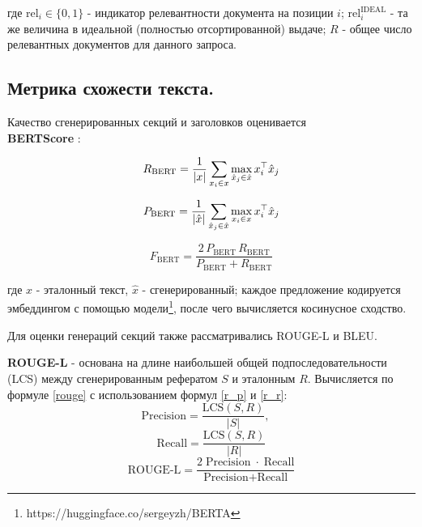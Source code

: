 \documentclass{article}
\begin{document}
где \(\mathrm{rel}_i\in\{0,1\}\) - индикатор релевантности документа на позиции \(i\); \(\mathrm{rel}^{\mathrm{IDEAL}}_i\) - та же величина в идеальной (полностью отсортированной) выдаче;  
\(R\) - общее число релевантных документов для данного запроса.  

\subsection*{Метрика схожести текста.} 
Качество сгенерированных секций и заголовков оценивается \\\textbf{BERTScore} \cite{bertscore}:

\begin{equation}\label{precision}
R_{\mathrm{BERT}}= \frac{1}{|x|}\sum_{x_i\in x}\max_{\hat{x}_j\in\hat{x}} x_i^\top \hat{x}_j\\
\end{equation}

\begin{equation}\label{recall}
P_{\mathrm{BERT}}= \frac{1}{|\hat{x}|}\sum_{\hat{x}_j\in\hat{x}}\max_{x_i\in x} x_i^\top \hat{x}_j\\
\end{equation}

\begin{equation}\label{f}
F_{\mathrm{BERT}}= \frac{2\,P_{\mathrm{BERT}}\,R_{\mathrm{BERT}}}{P_{\mathrm{BERT}} + R_{\mathrm{BERT}}}
\end{equation}

где \(x\) - эталонный текст, \(\hat{x}\) - сгенерированный; каждое предложение кодируется эмбеддингом с помощью модели\footnote{https://huggingface.co/sergeyzh/BERTA}, после чего вычисляется косинусное сходство.  

Для оценки генераций секций также рассматривались ROUGE-\allowbreak L и BLEU.

\textbf{ROUGE-L} \cite{rouge} - основана на длине наибольшей общей подпоследовательности (LCS) между сгенерированным рефератом $S$ и эталонным $R$.
Вычисляется по формуле \eqref{rouge} с использованием формул \eqref{r_p} и \eqref{r_r}:
\begin{equation}\label{r_p}
  \text{Precision} = \frac{\mathrm{LCS}(S,R)}{|S|},\quad
\end{equation}
\begin{equation}\label{r_r}
  \text{Recall} = \frac{\mathrm{LCS}(S,R)}{|R|}
\end{equation}
\begin{equation}\label{rouge}
  \text{ROUGE‑L} = \frac{2\;\text{Precision}\;\cdot\;\text{Recall}}{\text{Precision} + \text{Recall}}
\end{equation}
\end{document}
